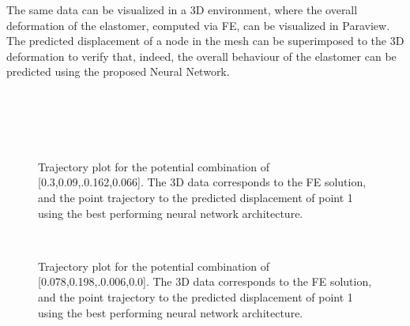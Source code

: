 \pagebreak
The same data can be visualized in a 3D environment, where the overall deformation of the elastomer, computed via FE, can be visualized in Paraview. The predicted displacement of a node in the mesh can be superimposed to the 3D deformation to verify that, indeed, the overall behaviour of the elastomer can be predicted using the proposed Neural Network.

\begin{figure}[H]
  \centering
  \\
  \\
\end{figure}
\begin{figure}[H]
  \centering
  \\
  \caption{Trajectory plot  for the potential combination of [0.3,0.09,.0.162,0.066]. The 3D data corresponds to the FE solution, and the point trajectory to the predicted displacement of point 1 using the best performing neural network architecture.}\label{fig:}
\end{figure}

\pagebreak

\begin{figure}
  \centering
  \\
  \caption{Trajectory plot  for the potential combination of [0.078,0.198,.0.006,0.0]. The 3D data corresponds to the FE solution, and the point trajectory to the predicted displacement of point 1 using the best performing neural network architecture.}\label{fig:}
\end{figure}




